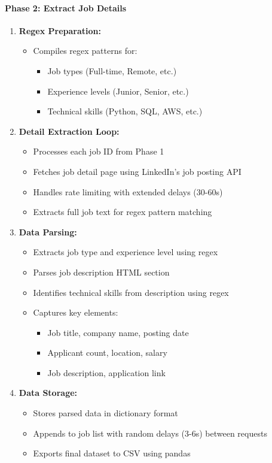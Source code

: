 \documentclass{svproc} %
\begin{document}
	\paragraph{Phase 2: Extract Job Details}
	\begin{enumerate}
		\item \textbf{Regex Preparation:}
		\begin{itemize}
			\item Compiles regex patterns for:
			\begin{itemize}
				\item Job types (Full-time, Remote, etc.)
				\item Experience levels (Junior, Senior, etc.)
				\item Technical skills (Python, SQL, AWS, etc.)
			\end{itemize}
		\end{itemize}
		
		\item \textbf{Detail Extraction Loop:}
		\begin{itemize}
			\item Processes each job ID from Phase 1
			\item Fetches job detail page using LinkedIn's job posting API
			\item Handles rate limiting with extended delays (30-60s)
			\item Extracts full job text for regex pattern matching
		\end{itemize}
		
		\item \textbf{Data Parsing:}
		\begin{itemize}
			\item Extracts job type and experience level using regex
			\item Parses job description HTML section
			\item Identifies technical skills from description using regex
			\item Captures key elements:
			\begin{itemize}
				\item Job title, company name, posting date
				\item Applicant count, location, salary
				\item Job description, application link
			\end{itemize}
		\end{itemize}
		
		\item \textbf{Data Storage:}
		\begin{itemize}
			\item Stores parsed data in dictionary format
			\item Appends to job list with random delays (3-6s) between requests
			\item Exports final dataset to CSV using pandas
		\end{itemize}
	\end{enumerate}
	
\end{document}
